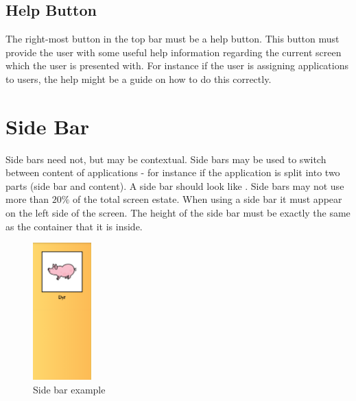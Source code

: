 \subsection{Help Button}
\label{sec:help_button}
The right-most button in the top bar must be a help button. This button must provide the user with some useful help information regarding the current screen which the user is presented with. For instance if the user is assigning applications to users, the help might be a guide on how to do this correctly.

\FloatBarrier


\section{Side Bar}

Side bars need not, but may be contextual. Side bars may be used to switch between content of applications - for instance if the application is split into two parts (side bar and content). A side bar should look like . Side bars may not use more than $20\%$ of the total screen estate. When using a side bar it must appear on the left side of the screen. The height of the side bar must be exactly the same as the container that it is inside.


\begin{note}
\end{note}

\begin{figure}[!htbp]
        \centering
        \includegraphics[width=0.20\textwidth]{pictures/application_structure/sidebar}
        \caption{Side bar example}
        \label{fig:side_bar_example}
\end{figure}

